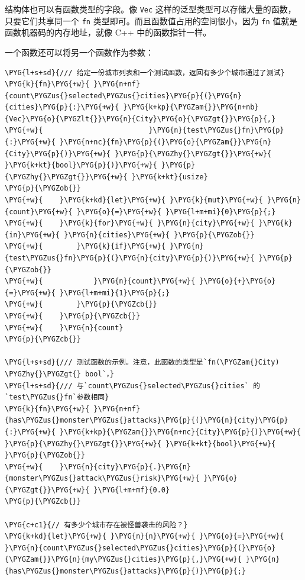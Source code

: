 结构体也可以有函数类型的字段。像 \texttt{Vec} 这样的泛型类型可以存储大量的函数，只要它们共享同一个 \texttt{fn} 类型即可。而且函数值占用的空间很小，因为 \texttt{fn} 值就是函数机器码的内存地址，就像 C++ 中的函数指针一样。

一个函数还可以将另一个函数作为参数：

\begin{Verbatim}[commandchars=\\\{\},breaklines=true,breakanywhere=true,fontsize=\codefont,xleftmargin=17bp]
\PYG{l+s+sd}{/// 给定一份城市列表和一个测试函数，返回有多少个城市通过了测试}
\PYG{k}{fn}\PYG{+w}{ }\PYG{n+nf}{count\PYGZus{}selected\PYGZus{}cities}\PYG{p}{(}\PYG{n}{cities}\PYG{p}{:}\PYG{+w}{ }\PYG{k+kp}{\PYGZam{}}\PYG{n+nb}{Vec}\PYG{o}{\PYGZlt{}}\PYG{n}{City}\PYG{o}{\PYGZgt{}}\PYG{p}{,}
\PYG{+w}{                         }\PYG{n}{test\PYGZus{}fn}\PYG{p}{:}\PYG{+w}{ }\PYG{n+nc}{fn}\PYG{p}{(}\PYG{o}{\PYGZam{}}\PYG{n}{City}\PYG{p}{)}\PYG{+w}{ }\PYG{p}{\PYGZhy{}\PYGZgt{}}\PYG{+w}{ }\PYG{k+kt}{bool}\PYG{p}{)}\PYG{+w}{ }\PYG{p}{\PYGZhy{}\PYGZgt{}}\PYG{+w}{ }\PYG{k+kt}{usize}
\PYG{p}{\PYGZob{}}
\PYG{+w}{    }\PYG{k+kd}{let}\PYG{+w}{ }\PYG{k}{mut}\PYG{+w}{ }\PYG{n}{count}\PYG{+w}{ }\PYG{o}{=}\PYG{+w}{ }\PYG{l+m+mi}{0}\PYG{p}{;}
\PYG{+w}{    }\PYG{k}{for}\PYG{+w}{ }\PYG{n}{city}\PYG{+w}{ }\PYG{k}{in}\PYG{+w}{ }\PYG{n}{cities}\PYG{+w}{ }\PYG{p}{\PYGZob{}}
\PYG{+w}{        }\PYG{k}{if}\PYG{+w}{ }\PYG{n}{test\PYGZus{}fn}\PYG{p}{(}\PYG{n}{city}\PYG{p}{)}\PYG{+w}{ }\PYG{p}{\PYGZob{}}
\PYG{+w}{            }\PYG{n}{count}\PYG{+w}{ }\PYG{o}{+}\PYG{o}{=}\PYG{+w}{ }\PYG{l+m+mi}{1}\PYG{p}{;}
\PYG{+w}{        }\PYG{p}{\PYGZcb{}}
\PYG{+w}{    }\PYG{p}{\PYGZcb{}}
\PYG{+w}{    }\PYG{n}{count}
\PYG{p}{\PYGZcb{}}

\PYG{l+s+sd}{/// 测试函数的示例。注意，此函数的类型是`fn(\PYGZam{}City) \PYGZhy{}\PYGZgt{} bool`，}
\PYG{l+s+sd}{/// 与`count\PYGZus{}selected\PYGZus{}cities` 的 `test\PYGZus{}fn`参数相同}
\PYG{k}{fn}\PYG{+w}{ }\PYG{n+nf}{has\PYGZus{}monster\PYGZus{}attacks}\PYG{p}{(}\PYG{n}{city}\PYG{p}{:}\PYG{+w}{ }\PYG{k+kp}{\PYGZam{}}\PYG{n+nc}{City}\PYG{p}{)}\PYG{+w}{ }\PYG{p}{\PYGZhy{}\PYGZgt{}}\PYG{+w}{ }\PYG{k+kt}{bool}\PYG{+w}{ }\PYG{p}{\PYGZob{}}
\PYG{+w}{    }\PYG{n}{city}\PYG{p}{.}\PYG{n}{monster\PYGZus{}attack\PYGZus{}risk}\PYG{+w}{ }\PYG{o}{\PYGZgt{}}\PYG{+w}{ }\PYG{l+m+mf}{0.0}
\PYG{p}{\PYGZcb{}}

\PYG{c+c1}{// 有多少个城市存在被怪兽袭击的风险？}
\PYG{k+kd}{let}\PYG{+w}{ }\PYG{n}{n}\PYG{+w}{ }\PYG{o}{=}\PYG{+w}{ }\PYG{n}{count\PYGZus{}selected\PYGZus{}cities}\PYG{p}{(}\PYG{o}{\PYGZam{}}\PYG{n}{my\PYGZus{}cities}\PYG{p}{,}\PYG{+w}{ }\PYG{n}{has\PYGZus{}monster\PYGZus{}attacks}\PYG{p}{)}\PYG{p}{;}
\end{Verbatim}

